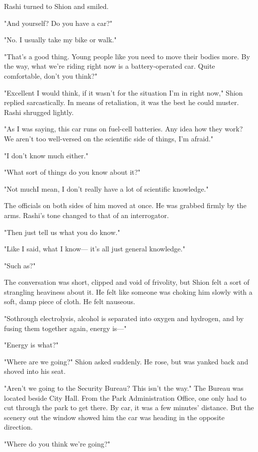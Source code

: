 Rashi turned to Shion and smiled.

"And yourself? Do you have a car?"

"No. I usually take my bike or walk."

"That's a good thing. Young people like you need to move their bodies
more. By the way, what we're riding right now is a battery-operated car.
Quite comfortable, don't you think?"

"Excellent I would think, if it wasn't for the situation I'm in right
now," Shion replied sarcastically. In means of retaliation, it was the
best he could muster. Rashi shrugged lightly.

"As I was saying, this car runs on fuel-cell batteries. Any idea how
they work? We aren't too well-versed on the scientific side of things,
I'm afraid."

"I don't know much either."

"What sort of things do you know about it?"

"Not much\el I mean, I don't really have a lot of scientific knowledge."

The officials on both sides of him moved at once. He was grabbed firmly
by the arms. Rashi's tone changed to that of an interrogator.

"Then just tell us what you do know."

"Like I said, what I know--- it's all just general knowledge."

"Such as?"

The conversation was short, clipped and void of frivolity, but Shion
felt a sort of strangling heaviness about it. He felt like someone was
choking him slowly with a soft, damp piece of cloth. He felt nauseous.

"So\el through electrolysis, alcohol is separated into oxygen and
hydrogen, and by fusing them together again, energy is---"

"Energy is what?"

"Where are we going?" Shion asked suddenly. He rose, but was yanked back
and shoved into his seat.

"Aren't we going to the Security Bureau? This isn't the way." The Bureau
was located beside City Hall. From the Park Administration Office, one
only had to cut through the park to get there. By car, it was a few
minutes' distance. But the scenery out the window showed him the car was
heading in the opposite direction.

"Where do you think we're going?"

